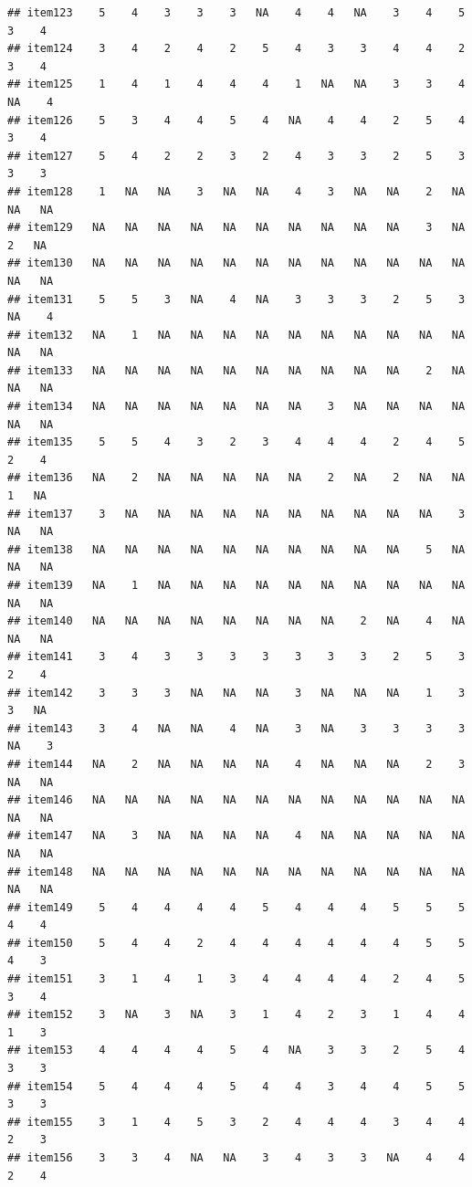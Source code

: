 \documentclass[
  man]{apa6}
\begin{document}
\begin{verbatim}
## item123    5    4    3    3    3   NA    4    4   NA    3    4    5    3    4
## item124    3    4    2    4    2    5    4    3    3    4    4    2    3    4
## item125    1    4    1    4    4    4    1   NA   NA    3    3    4   NA    4
## item126    5    3    4    4    5    4   NA    4    4    2    5    4    3    4
## item127    5    4    2    2    3    2    4    3    3    2    5    3    3    3
## item128    1   NA   NA    3   NA   NA    4    3   NA   NA    2   NA   NA   NA
## item129   NA   NA   NA   NA   NA   NA   NA   NA   NA   NA    3   NA    2   NA
## item130   NA   NA   NA   NA   NA   NA   NA   NA   NA   NA   NA   NA   NA   NA
## item131    5    5    3   NA    4   NA    3    3    3    2    5    3   NA    4
## item132   NA    1   NA   NA   NA   NA   NA   NA   NA   NA   NA   NA   NA   NA
## item133   NA   NA   NA   NA   NA   NA   NA   NA   NA   NA    2   NA   NA   NA
## item134   NA   NA   NA   NA   NA   NA   NA    3   NA   NA   NA   NA   NA   NA
## item135    5    5    4    3    2    3    4    4    4    2    4    5    2    4
## item136   NA    2   NA   NA   NA   NA   NA    2   NA    2   NA   NA    1   NA
## item137    3   NA   NA   NA   NA   NA   NA   NA   NA   NA   NA    3   NA   NA
## item138   NA   NA   NA   NA   NA   NA   NA   NA   NA   NA    5   NA   NA   NA
## item139   NA    1   NA   NA   NA   NA   NA   NA   NA   NA   NA   NA   NA   NA
## item140   NA   NA   NA   NA   NA   NA   NA   NA    2   NA    4   NA   NA   NA
## item141    3    4    3    3    3    3    3    3    3    2    5    3    2    4
## item142    3    3    3   NA   NA   NA    3   NA   NA   NA    1    3    3   NA
## item143    3    4   NA   NA    4   NA    3   NA    3    3    3    3   NA    3
## item144   NA    2   NA   NA   NA   NA    4   NA   NA   NA    2    3   NA   NA
## item146   NA   NA   NA   NA   NA   NA   NA   NA   NA   NA   NA   NA   NA   NA
## item147   NA    3   NA   NA   NA   NA    4   NA   NA   NA   NA   NA   NA   NA
## item148   NA   NA   NA   NA   NA   NA   NA   NA   NA   NA   NA   NA   NA   NA
## item149    5    4    4    4    4    5    4    4    4    5    5    5    4    4
## item150    5    4    4    2    4    4    4    4    4    4    5    5    4    3
## item151    3    1    4    1    3    4    4    4    4    2    4    5    3    4
## item152    3   NA    3   NA    3    1    4    2    3    1    4    4    1    3
## item153    4    4    4    4    5    4   NA    3    3    2    5    4    3    3
## item154    5    4    4    4    5    4    4    3    4    4    5    5    3    3
## item155    3    1    4    5    3    2    4    4    4    3    4    4    2    3
## item156    3    3    4   NA   NA    3    4    3    3   NA    4    4    2    4

\end{verbatim}
\end{document}
